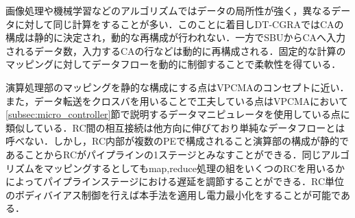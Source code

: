 {画像処理や機械学習などのアルゴリズムではデータの局所性が強く，異なるデータに対して同じ計算をすることが多い．このことに着目しDT-CGRAではCAの構成は静的に決定され，動的な再構成が行われない．一方でSBUからCAへ入力されるデータ数，入力するCAの行などは動的に再構成される．固定的な計算のマッピングに対してデータフローを動的に制御することで柔軟性を得ている．

演算処理部のマッピングを静的な構成にする点はVPCMAのコンセプトに近い．また，データ転送をクロスバを用いることで工夫している点はVPCMAにおいて\ref{subsec:micro_controller}節で説明するデータマニピュレータを使用している点に類似している．RC間の相互接続は他方向に伸びており単純なデータフローとは呼べない．しかし，RC内部が複数のPEで構成されること演算部の構成が静的であることからRCがパイプラインの1ステージとみなすことができる．同じアルゴリズムをマッピングするとしてもmap,reduce処理の組をいくつのRCを用いるかによってパイプラインステージにおける遅延を調節することができる．RC単位のボディバイアス制御を行えば本手法を適用し電力最小化をすることが可能である．

}